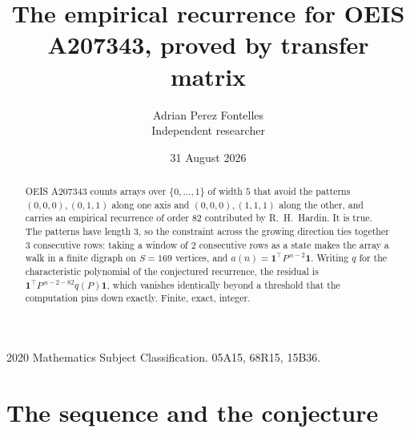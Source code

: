 \documentclass[11pt,a4paper]{article}
\title{The empirical recurrence for OEIS A207343, proved by transfer matrix}
\author{Adrian Perez Fontelles\\ \small Independent researcher}
\date{31 August 2026}
\theoremstyle{plain}
\theoremstyle{definition}
\begin{document}
\maketitle

\begin{abstract}
OEIS A207343 counts arrays over $\{0,\dots,1\}$ of width $5$ that avoid the patterns
$(0,0,0), (0,1,1)$ along one axis and $(0,0,0), (1,1,1)$ along the other, and carries an empirical recurrence of
order $82$ contributed by R.~H.~Hardin. It is true. The patterns have length $3$, so
the constraint across the growing direction ties together $3$ consecutive rows: taking a
window of $2$ consecutive rows as a state makes the array a walk in a finite digraph
on $S=169$ vertices, and $a(n)=\mathbf{1}^{\!\top}P^{\,n-2}\mathbf{1}$. Writing $q$
for the characteristic polynomial of the conjectured recurrence, the residual is
$\mathbf{1}^{\!\top}P^{\,n-2-82}q(P)\mathbf{1}$, which vanishes identically
beyond a threshold that the computation pins down exactly. Finite, exact, integer.
\end{abstract}

\noindent\small 2020 Mathematics Subject Classification. 05A15, 68R15, 15B36.\normalsize

\section{The sequence and the conjecture}
\end{document}
